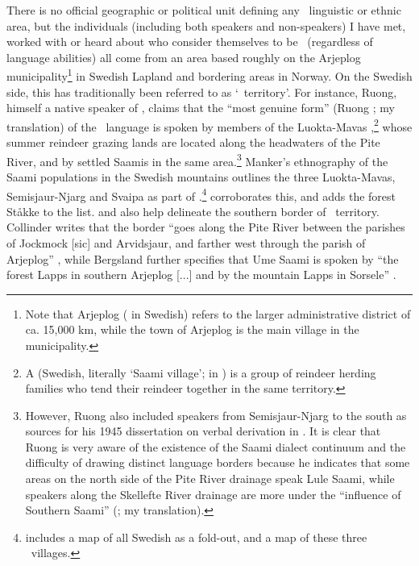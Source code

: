 There is no official geographic or political unit defining any \PS\ linguistic or ethnic area, but the individuals (including both speakers and non-speakers) I have met, worked with or heard about who consider themselves to be \PS\ (regardless of language abilities) all come from an area based roughly on the Arjeplog municipality\footnote{Note that Arjeplog  ( in Swedish) refers to the larger administrative district of ca. 15,000 km, while the town of Arjeplog is the main village in the municipality.} 
in Swedish Lapland and bordering areas in Norway. On the Swedish side, this has traditionally been referred to as  ‘\PS\ territory’. 
For instance, Ruong, himself a native speaker of \PS, claims that the “most genuine form” (Ruong \citeyear[iii]{Ruong1943}; my translation) of the \PS\ language is spoken by members of the Luokta-Mavas ,\footnote{A  (Swedish, literally ‘Saami village’;  in \PL) is a group of reindeer herding families who tend their reindeer together in the same territory.} 
whose summer reindeer grazing lands are located along the headwaters of the Pite River, and by settled Saamis in the same area.\footnote{However, Ruong also included speakers from Semisjaur-Njarg  to the south as sources for his 1945 dissertation on verbal derivation in \PS. It is clear that Ruong is very aware of the existence of the Saami dialect continuum and the difficulty of drawing distinct language borders because he indicates that some areas on the north side of the Pite River drainage speak Lule Saami, while speakers along the Skellefte River drainage are more under the “influence of Southern Saami” (\cite[iii]{Ruong1945}; my translation).} 
Manker’s ethnography of the Saami populations in the Swedish mountains \citep{Manker1947} outlines the three  Luokta-Mavas, Semisjaur-Njarg and Svaipa as part of .\footnote{\citet[473]{Manker1947} includes a map of all Swedish  as a fold-out, and a map of these three \PS\ villages.} 
\citet[22]{Sammallahti1998} corroborates this, and adds the forest  Ståkke to the list. \citet{Collinder1960} and \citet{Bergsland1962} also help delineate the southern border of \PS\ territory. Collinder writes that the border “goes along the Pite River between the parishes of Jockmock [sic] and Arvidsjaur, and farther west through the parish of Arjeplog” \cite[23]{Collinder1960}, while Bergsland further specifies that Ume Saami is spoken by “the forest Lapps in southern Arjeplog [...] and by the mountain Lapps in Sorsele” \cite[27]{Bergsland1962}. %

